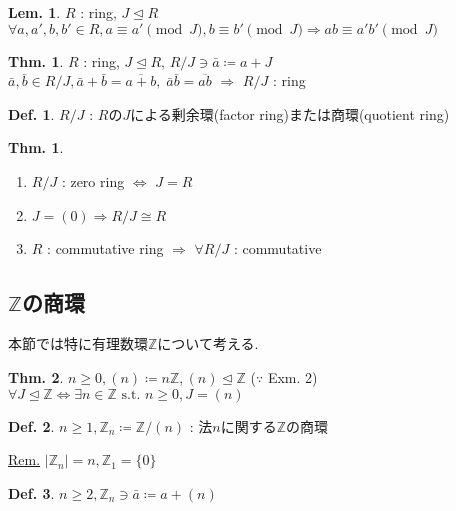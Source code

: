 \documentclass[uplatex,dvipdfmx,9pt]{beamer}
\newcommand{\st}{\text{ s.t. }}
\newcommand{\ideal}{\trianglelefteq}
\newcommand{\Z}{\mathbb{Z}}
\newcommand{\sscount}{\textsection \thesubsection}
\newcounter{textThmCount}
\newcounter{textLemCount}
\newcounter{textExmCount}
\theoremstyle{definition} %
\newtheorem{defn}{Def.}[subsection] %
\newtheorem{thm}{Thm.}[subsection] %
\newtheorem{thmText}[textThmCount]{Thm.}
\newtheorem{lemText}[textLemCount]{Lem.} %
\theoremstyle{example}
\begin{document}
    \begin{frame}

      \begin{lemText}
        $R$ : ring, $J \ideal R$ \\
        $\forall a, a', b, b' \in R, a \equiv a' \pmod{J}, b \equiv b' \pmod{J} \Rightarrow ab \equiv a'b' \pmod{J}$
      \end{lemText}

      \begin{thmText}
        $R$ : ring, $J \ideal R$, $R/J \ni \bar{a} \coloneqq a + J$ \\
        $\bar{a}, \bar{b} \in R/J, \bar{a} + \bar{b} = \overline{a + b}, \; \bar{a}\bar{b} = \overline{ab}$ $\Rightarrow$ $R/J$ : ring
      \end{thmText}

      \begin{defn}
        $R/J$ : $R$の$J$による\alert{剰余環(factor ring)}または\alert{商環(quotient ring)}
      \end{defn}

      \begin{thm}
        \begin{enumerate}
          \item $R/J$ : zero ring $\Leftrightarrow$ $J = R$
          \item $J = (0) \Rightarrow R/J \cong R$
          \item $R$ : commutative ring $\Rightarrow$ $\forall R/J$ : commutative
        \end{enumerate}
      \end{thm}

    \end{frame}

    \subsection{\sscount \texorpdfstring{ $\Z$}{Z}の商環}
    \setcounter{textExmCount}{0}

    \begin{frame}
      本節では特に有理数環$\Z$について考える.
      
      \begin{thm}
        $n \ge 0, (n) \coloneqq n\Z, (n) \ideal \Z$ ($\because$  Exm. 2) \\
        $\forall J \ideal \Z \Leftrightarrow \exists n \in \Z \st n \ge 0, J = (n)$
      \end{thm}

      \begin{defn}
        $n \ge 1, \Z_n \coloneqq \Z / (n)$ : 法$n$に関する$\Z$の商環
      \end{defn}
      \underline{Rem.} $|\Z_n| = n, \Z_1 = \{0\}$

      \begin{defn}
        $n \ge 2, \Z_n \ni \bar{a} \coloneqq a + (n)$
      \end{defn}

    \end{frame}
\end{document}
